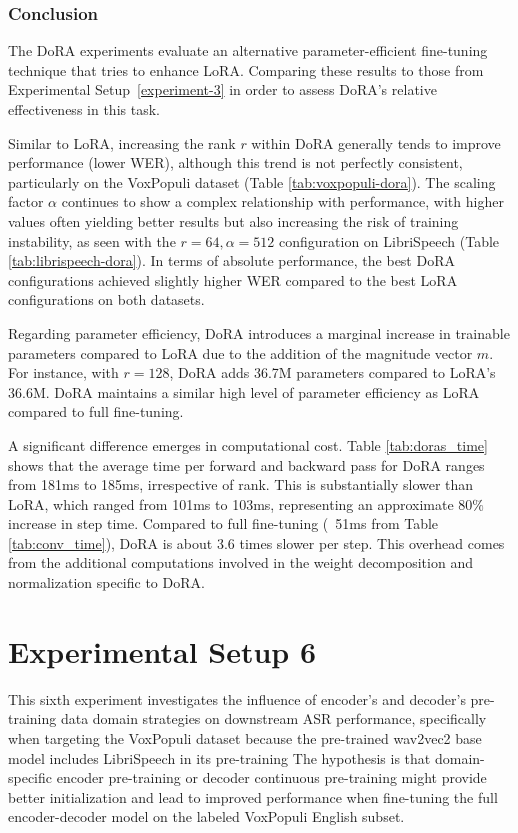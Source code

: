 \subsubsection{Conclusion}

The DoRA experiments evaluate an alternative parameter-efficient fine-tuning technique that tries to enhance LoRA. Comparing these results to those from Experimental Setup~\ref{experiment-3} in order to assess DoRA's relative effectiveness in this task.

Similar to LoRA, increasing the rank \( r \) within DoRA generally tends to improve performance (lower WER), although this trend is not perfectly consistent, particularly on the VoxPopuli dataset (Table \ref{tab:voxpopuli-dora}). The scaling factor \( \alpha \) continues to show a complex relationship with performance, with higher values often yielding better results but also increasing the risk of training instability, as seen with the \( r=64, \alpha=512 \) configuration on LibriSpeech (Table \ref{tab:librispeech-dora}). In terms of absolute performance, the best DoRA configurations achieved slightly higher WER compared to the best LoRA configurations on both datasets.

Regarding parameter efficiency, DoRA introduces a marginal increase in trainable parameters compared to LoRA due to the addition of the magnitude vector \( m \). For instance, with \( r=128 \), DoRA adds 36.7M parameters compared to LoRA's 36.6M. DoRA maintains a similar high level of parameter efficiency as LoRA compared to full fine-tuning.

A significant difference emerges in computational cost. Table \ref{tab:doras_time} shows that the average time per forward and backward pass for DoRA ranges from 181ms to 185ms, irrespective of rank. This is substantially slower than LoRA, which ranged from 101ms to 103ms, representing an approximate $ 80\% $ increase in step time. Compared to full fine-tuning (~51ms from Table \ref{tab:conv_time}), DoRA is about 3.6 times slower per step. This overhead comes from the additional computations involved in the weight decomposition and normalization specific to DoRA.

\section{Experimental Setup 6}
\label{exp:voxpopuli_pretrained_encoders_and_decoder}

This sixth experiment investigates the influence of encoder's and decoder's pre-training data domain strategies on downstream ASR performance, specifically when targeting the VoxPopuli dataset because the pre-trained wav2vec2 base model includes LibriSpeech in its pre-training 
The hypothesis is that domain-specific encoder pre-training or decoder continuous pre-training might provide better initialization and lead to improved performance when fine-tuning the full encoder-decoder model on the labeled VoxPopuli English subset.

